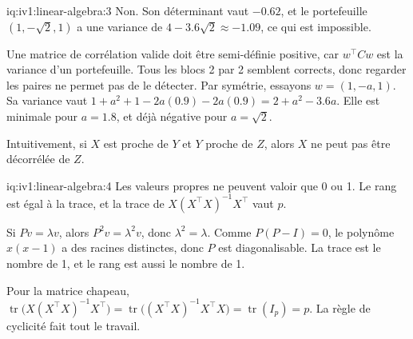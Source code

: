 \begin{solution}{iq:iv1:linear-algebra:3}
Non. Son déterminant vaut $-0.62$, et le portefeuille $(1, -\sqrt{2}, 1)$ a une variance de $4 - 3.6\sqrt{2} \approx -1.09$, ce qui est impossible.

Une matrice de corrélation valide doit être semi-définie positive, car $w^\top Cw$ est la variance d'un portefeuille. Tous les blocs 2 par 2 semblent corrects, donc regarder les paires ne permet pas de le détecter. Par symétrie, essayons $w = (1, -a, 1)$. Sa variance vaut $1 + a^2 + 1 - 2a(0.9) - 2a(0.9) = 2 + a^2 - 3.6a$. Elle est minimale pour $a = 1.8$, et déjà négative pour $a = \sqrt{2}$.

Intuitivement, si $X$ est proche de $Y$ et $Y$ proche de $Z$, alors $X$ ne peut pas être décorrélée de $Z$.

\end{solution}

\begin{solution}{iq:iv1:linear-algebra:4}
Les valeurs propres ne peuvent valoir que 0 ou 1. Le rang est égal à la trace, et la trace de $X(X^\top X)^{-1}X^\top$ vaut $p$.

Si $Pv = \lambda v$, alors $P^2v = \lambda^2v$, donc $\lambda^2 = \lambda$. Comme $P(P - I) = 0$, le polynôme $x(x - 1)$ a des racines distinctes, donc $P$ est diagonalisable. La trace est le nombre de 1, et le rang est aussi le nombre de 1.

Pour la matrice chapeau, $\operatorname{tr}\bigl(X(X^\top X)^{-1}X^\top\bigr) = \operatorname{tr}\bigl((X^\top X)^{-1}X^\top X\bigr) = \operatorname{tr}(I_p) = p$. La règle de cyclicité fait tout le travail.

\end{solution}

